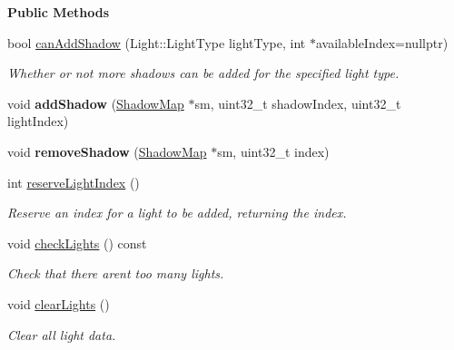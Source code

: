 \begin{Indent}\textbf{ Public Methods}\par
\begin{DoxyCompactItemize}
\item 
\mbox{\label{classrev_1_1_lighting_settings_aa5165eae550402228c9ec87d97c74728}} 
bool \mbox{\hyperlink{classrev_1_1_lighting_settings_aa5165eae550402228c9ec87d97c74728}{can\+Add\+Shadow}} (Light\+::\+Light\+Type light\+Type, int $\ast$available\+Index=nullptr)
\begin{DoxyCompactList}\small\item\em Whether or not more shadows can be added for the specified light type. \end{DoxyCompactList}\item 
\mbox{\label{classrev_1_1_lighting_settings_a3f9b88253315f4410a604855c8f536c1}} 
void {\bfseries add\+Shadow} (\mbox{\hyperlink{classrev_1_1_shadow_map}{Shadow\+Map}} $\ast$sm, uint32\+\_\+t shadow\+Index, uint32\+\_\+t light\+Index)
\item 
\mbox{\label{classrev_1_1_lighting_settings_a0826366a95b8bcd1b5ede2bae7d939f5}} 
void {\bfseries remove\+Shadow} (\mbox{\hyperlink{classrev_1_1_shadow_map}{Shadow\+Map}} $\ast$sm, uint32\+\_\+t index)
\item 
\mbox{\label{classrev_1_1_lighting_settings_a3f9ee4ede906a6ffc0b56e6457625170}} 
int \mbox{\hyperlink{classrev_1_1_lighting_settings_a3f9ee4ede906a6ffc0b56e6457625170}{reserve\+Light\+Index}} ()
\begin{DoxyCompactList}\small\item\em Reserve an index for a light to be added, returning the index. \end{DoxyCompactList}\item 
\mbox{\label{classrev_1_1_lighting_settings_ab387a4ab2e46ec2d76a0919d5a5504ca}} 
void \mbox{\hyperlink{classrev_1_1_lighting_settings_ab387a4ab2e46ec2d76a0919d5a5504ca}{check\+Lights}} () const
\begin{DoxyCompactList}\small\item\em Check that there aren\textquotesingle{}t too many lights. \end{DoxyCompactList}\item 
\mbox{\label{classrev_1_1_lighting_settings_aea54d0058d96513442a6e62ea7b9aa03}} 
void \mbox{\hyperlink{classrev_1_1_lighting_settings_aea54d0058d96513442a6e62ea7b9aa03}{clear\+Lights}} ()
\begin{DoxyCompactList}\small\item\em Clear all light data. \end{DoxyCompactList}\end{DoxyCompactItemize}
\end{Indent}
